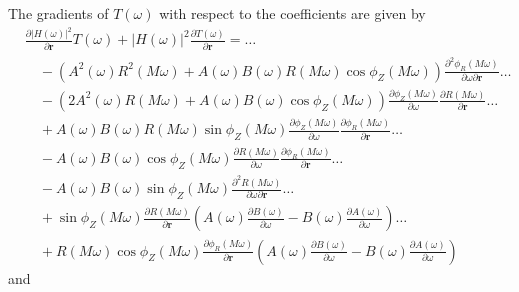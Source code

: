 \documentclass[a4paper,twoside,10pt,english]{report}
\begin{document}
The gradients of $T\left(\omega\right)$ with respect to the coefficients are
given by
\begin{align*}
&\frac{\partial\left|H\left(\omega\right)\right|^{2}}{\partial\boldsymbol{r}}
T\left(\omega\right)+\left|H\left(\omega\right)\right|^{2}
\frac{\partial T\left(\omega\right)}{\partial\boldsymbol{r}}=\hdots \\
& \quad -\left(A^{2}\left(\omega\right)R^{2}\left(M\omega\right) 
+A\left(\omega\right)B\left(\omega\right)R\left(M\omega\right)
\cos\phi_{Z}\left(M\omega\right)\right)
\frac{\partial^{2}\phi_{R}\left(M\omega\right)}
{\partial\omega\partial\boldsymbol{r}} \hdots \\
& \quad -\left(2A^{2}\left(\omega\right)R\left(M\omega\right)
+A\left(\omega\right)B\left(\omega\right)\cos\phi_{Z}\left(M\omega\right)\right)
\frac{\partial\phi_{Z}\left(M\omega\right)}{\partial\omega} 
\frac{\partial R\left(M\omega\right)}{\partial\boldsymbol{r}} \hdots \\
& \quad +A\left(\omega\right)B\left(\omega\right)R\left(M\omega\right)
\sin\phi_{Z}\left(M\omega\right)
\frac{\partial\phi_{Z}\left(M\omega\right)}{\partial\omega}
\frac{\partial\phi_{R}\left(M\omega\right)}{\partial\boldsymbol{r}} \hdots \\
& \quad -A\left(\omega\right)B\left(\omega\right)\cos\phi_{Z}\left(M\omega\right)
\frac{\partial R\left(M\omega\right)}{\partial\omega} 
\frac{\partial\phi_{R}\left(M\omega\right)}{\partial\boldsymbol{r}} \hdots \\
& \quad -A\left(\omega\right)B\left(\omega\right)\sin\phi_{Z}\left(M\omega\right)
\frac{\partial^{2}R\left(M\omega\right)}{\partial\omega\partial\boldsymbol{r}}
\hdots \\
& \quad +\sin\phi_{Z}\left(M\omega\right)
\frac{\partial R\left(M\omega\right)}{\partial\boldsymbol{r}}
\left(A\left(\omega\right)\frac{\partial B\left(\omega\right)}{\partial\omega}
-B\left(\omega\right)\frac{\partial A\left(\omega\right)}{\partial\omega}\right)
\hdots \\
& \quad +R\left(M\omega\right)\cos\phi_{Z}\left(M\omega\right)
\frac{\partial\phi_{R}\left(M\omega\right)}{\partial\boldsymbol{r}}
\left(A\left(\omega\right)\frac{\partial B\left(\omega\right)}{\partial\omega} 
-B\left(\omega\right)\frac{\partial A\left(\omega\right)}{\partial\omega}\right)
\end{align*}
and
\end{document}
